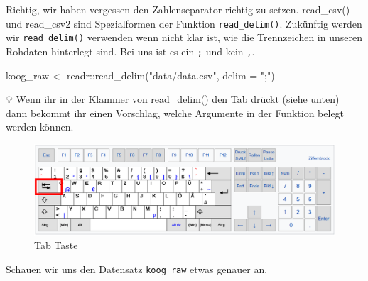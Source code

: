 \documentclass[
]{article}
\newenvironment{Shaded}{\begin{snugshade}}{\end{snugshade}}
\newcommand{\AttributeTok}[1]{\textcolor[rgb]{0.77,0.63,0.00}{#1}}
\newcommand{\FunctionTok}[1]{\textcolor[rgb]{0.00,0.00,0.00}{#1}}
\newcommand{\NormalTok}[1]{#1}
\newcommand{\OtherTok}[1]{\textcolor[rgb]{0.56,0.35,0.01}{#1}}
\newcommand{\SpecialCharTok}[1]{\textcolor[rgb]{0.00,0.00,0.00}{#1}}
\newcommand{\StringTok}[1]{\textcolor[rgb]{0.31,0.60,0.02}{#1}}
\begin{document}
Richtig, wir haben vergessen den Zahlenseparator richtig zu setzen. read\_csv() und read\_csv2 sind Spezialformen der Funktion \texttt{read\_delim()}. Zukünftig werden wir \texttt{read\_delim()} verwenden wenn nicht klar ist, wie die Trennzeichen in unseren Rohdaten hinterlegt sind. Bei uns ist es ein \texttt{;} und kein \texttt{,}.

\begin{Shaded}
\begin{Highlighting}[]
\NormalTok{koog\_raw }\OtherTok{\textless{}{-}}\NormalTok{ readr}\SpecialCharTok{::}\FunctionTok{read\_delim}\NormalTok{(}\StringTok{"data/data.csv"}\NormalTok{, }\AttributeTok{delim =} \StringTok{";"}\NormalTok{)}
\end{Highlighting}
\end{Shaded}

💡 Wenn ihr in der Klammer von read\_delim() den Tab drückt (siehe unten) dann bekommt ihr einen Vorschlag, welche Argumente in der Funktion belegt werden können.

\begin{figure}

{\centering \includegraphics[width=19.26in]{images/030} 

}

\caption{Tab Taste}\label{fig:unnamed-chunk-108}
\end{figure}

Schauen wir uns den Datensatz \texttt{koog\_raw} etwas genauer an.
\end{document}
